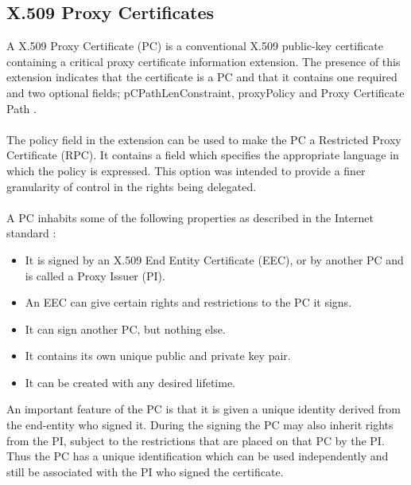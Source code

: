 \subsection{X.509 Proxy Certificates} \label{background_pc}
A X.509 Proxy Certificate (PC) is a conventional X.509 public-key certificate containing a critical proxy certificate information extension. The presence of this extension indicates that the certificate is a PC and that it contains one required and two optional fields; pCPathLenConstraint, proxyPolicy and Proxy Certificate Path \cite{tuecke2004rfc3820}.
\\\\
The policy field in the extension can be used to make the PC a Restricted Proxy Certificate (RPC). It contains a field which specifies the appropriate language in which the policy is expressed. This option was intended to provide a finer granularity of control in the rights being delegated.
\\\\
A PC inhabits some of the following properties as described in the Internet standard \cite{tuecke2004rfc3820}:

\begin{itemize}
\item It is signed by an X.509 End Entity Certificate (EEC), or by another PC and is called a Proxy Issuer (PI).
\item An EEC can give certain rights and restrictions to the PC it signs. 
\item It can sign another PC, but nothing else.
\item It contains its own unique public and private key pair.
\item It can be created with any desired lifetime.
\end{itemize}

\noindent
An important feature of the PC is that it is given a unique identity derived from the end-entity who signed it. During the signing the PC may also inherit rights from the PI, subject to the restrictions that are placed on that PC by the PI. Thus the PC has a unique identification which can be used independently and still be associated with the PI who signed the certificate.


